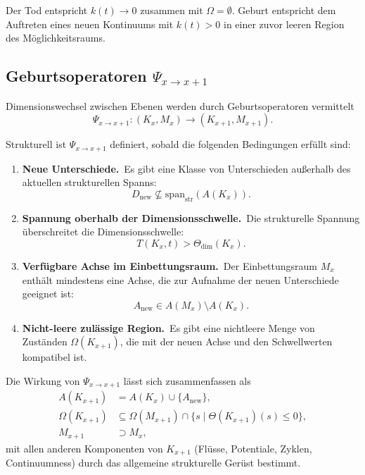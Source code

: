 Der Tod entspricht \(k(t) \to 0\) zusammen mit \(\Omega = \emptyset\).
Geburt entspricht dem Auftreten eines neuen Kontinuums mit \(k(t) > 0\) in einer
zuvor leeren Region des Möglichkeitsraums.

\subsection{Geburtsoperatoren \texorpdfstring{$\Psi_{x\to x+1}$}{Psi\_x→x+1}}
\label{sec:birth-operators}

Dimensionswechsel zwischen Ebenen werden durch Geburtsoperatoren vermittelt
\[
  \Psi_{x\to x+1} : (K_x, M_x) \longrightarrow (K_{x+1}, M_{x+1}).
\]

Strukturell ist \(\Psi_{x\to x+1}\) definiert, sobald die folgenden Bedingungen
erfüllt sind:
\begin{enumerate}
  \item \textbf{Neue Unterschiede.}\
        Es gibt eine Klasse von Unterschieden außerhalb des aktuellen
        strukturellen Spanns:
        \[
          D_{\mathrm{new}}\not\subseteq
          \mathrm{span}_{\mathrm{str}}(A(K_x)).
        \]
  \item \textbf{Spannung oberhalb der Dimensionsschwelle.}\
        Die strukturelle Spannung überschreitet die Dimensionsschwelle:
        \[
          T(K_x,t) > \Theta_{\mathrm{dim}}(K_x).
        \]
  \item \textbf{Verfügbare Achse im Einbettungsraum.}\
        Der Einbettungsraum \(M_x\) enthält mindestens eine Achse, die zur
        Aufnahme der neuen Unterschiede geeignet ist:
        \[
          A_{\mathrm{new}} \in A(M_x) \setminus A(K_x).
        \]
  \item \textbf{Nicht-leere zulässige Region.}\
        Es gibt eine nichtleere Menge von Zuständen \(\Omega(K_{x+1})\), die mit
        der neuen Achse und den Schwellwerten kompatibel ist.
\end{enumerate}

Die Wirkung von \(\Psi_{x\to x+1}\) lässt sich zusammenfassen als
\begin{align*}
  A(K_{x+1})      &= A(K_x) \cup \{A_{\mathrm{new}}\}, \\
  \Omega(K_{x+1}) &\subseteq
     \Omega(M_{x+1}) \cap
     \big\{ s \mid \Theta(K_{x+1})(s) \le 0 \big\}, \\
  M_{x+1}         &\supset M_x,
\end{align*}
mit allen anderen Komponenten von \(K_{x+1}\) (Flüsse, Potentiale, Zyklen,
Continuumness) durch das allgemeine strukturelle Gerüst bestimmt.

